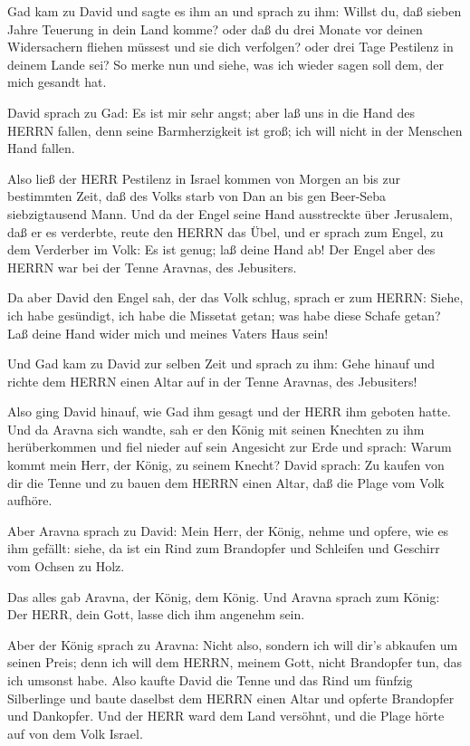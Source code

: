  Gad kam zu David und sagte es ihm an und sprach zu ihm:
Willst du, daß sieben Jahre Teuerung in dein Land komme? oder daß du
drei Monate vor deinen Widersachern fliehen müssest und sie dich
verfolgen? oder drei Tage Pestilenz in deinem Lande sei? So merke nun
und siehe, was ich wieder sagen soll dem, der mich gesandt hat.

 David sprach zu Gad: Es ist mir sehr angst; aber laß uns
in die Hand des HERRN fallen, denn seine Barmherzigkeit ist groß; ich
will nicht in der Menschen Hand fallen.

 Also ließ der HERR Pestilenz in Israel kommen von Morgen
an bis zur bestimmten Zeit, daß des Volks starb von Dan an bis gen
Beer-Seba siebzigtausend Mann.  Und da der Engel seine Hand
ausstreckte über Jerusalem, daß er es verderbte, reute den HERRN das
Übel, und er sprach zum Engel, zu dem Verderber im Volk: Es ist genug;
laß deine Hand ab! Der Engel aber des HERRN war bei der Tenne Aravnas,
des Jebusiters.

 Da aber David den Engel sah, der das Volk schlug, sprach
er zum HERRN: Siehe, ich habe gesündigt, ich habe die Missetat getan;
was habe diese Schafe getan? Laß deine Hand wider mich und meines Vaters
Haus sein!

 Und Gad kam zu David zur selben Zeit und sprach zu ihm:
Gehe hinauf und richte dem HERRN einen Altar auf in der Tenne Aravnas,
des Jebusiters!

 Also ging David hinauf, wie Gad ihm gesagt und der HERR
ihm geboten hatte.  Und da Aravna sich wandte, sah er den
König mit seinen Knechten zu ihm herüberkommen und fiel nieder auf sein
Angesicht zur Erde  und sprach: Warum kommt mein Herr, der
König, zu seinem Knecht? David sprach: Zu kaufen von dir die Tenne und
zu bauen dem HERRN einen Altar, daß die Plage vom Volk aufhöre.

 Aber Aravna sprach zu David: Mein Herr, der König, nehme
und opfere, wie es ihm gefällt: siehe, da ist ein Rind zum Brandopfer
und Schleifen und Geschirr vom Ochsen zu Holz.

 Das alles gab Aravna, der König, dem König. Und Aravna
sprach zum König: Der HERR, dein Gott, lasse dich ihm angenehm sein.

 Aber der König sprach zu Aravna: Nicht also, sondern ich
will dir's abkaufen um seinen Preis; denn ich will dem HERRN, meinem
Gott, nicht Brandopfer tun, das ich umsonst habe. Also kaufte David die
Tenne und das Rind um fünfzig Silberlinge  und baute
daselbst dem HERRN einen Altar und opferte Brandopfer und Dankopfer. Und
der HERR ward dem Land versöhnt, und die Plage hörte auf von dem Volk
Israel.
